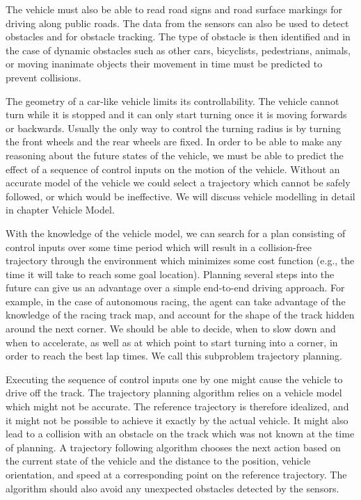 The vehicle must also be able to read road signs and road surface markings for driving along public roads. The data from the sensors can also be used to detect obstacles and for obstacle tracking. The type of obstacle is then identified and in the case of dynamic obstacles such as other cars, bicyclists, pedestrians, animals, or moving inanimate objects their movement in time must be predicted to prevent collisions.

The geometry of a car-like vehicle limits its controllability. The vehicle cannot turn while it is stopped and it can only start turning once it is moving forwards or backwards. Usually the only way to control the turning radius is by turning the front wheels and the rear wheels are fixed. In order to be able to make any reasoning about the future states of the vehicle, we must be able to predict the effect of a sequence of control inputs on the motion of the vehicle. Without an accurate model of the vehicle we could select a trajectory which cannot be safely followed, or which would be ineffective. We will discuss vehicle modelling in detail in chapter Vehicle Model.

With the knowledge of the vehicle model, we can search for a plan consisting of control inputs over some time period which will result in a collision-free trajectory through the environment which minimizes some cost function (e.g., the time it will take to reach some goal location). Planning several steps into the future can give us an advantage over a simple end-to-end driving approach. For example, in the case of autonomous racing, the agent can take advantage of the knowledge of the racing track map, and account for the shape of the track hidden around the next corner. We should be able to decide, when to slow down and when to accelerate, as well as at which point to start turning into a corner, in order to reach the best lap times. We call this subproblem trajectory planning.

Executing the sequence of control inputs one by one might cause the vehicle to drive off the track. The trajectory planning algorithm relies on a vehicle model which might not be accurate. The reference trajectory is therefore idealized, and it might not be possible to achieve it exactly by the actual vehicle. It might also lead to a collision with an obstacle on the track which was not known at the time of planning. A trajectory following algorithm chooses the next action based on the current state of the vehicle and the distance to the position, vehicle orientation, and speed at a corresponding point on the reference trajectory. The algorithm should also avoid any unexpected obstacles detected by the sensors.

